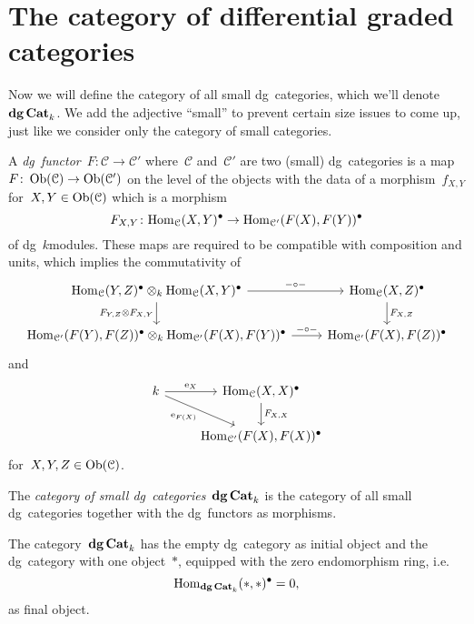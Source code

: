 \section{The category of differential graded categories}
Now we will define the category of all small dg~categories, which we'll denote~$\mathbf{dg\,Cat}_k$. We add the adjective ``small'' to prevent certain size issues to come up, just like we consider only the category of small categories.
\begin{definition}
  A \emph{dg~functor}~$F\colon\mathcal{C}\to\mathcal{C}'$ where~$\mathcal{C}$ and~$\mathcal{C}'$ are two (small) dg~categories is a map~$F\colon\operatorname{Ob}(\mathcal{C})\to\operatorname{Ob}(\mathcal{C}')$ on the level of the objects with the data of a morphism~$f_{X,Y}$ for~$X,Y\in\operatorname{Ob}(\mathcal{C})$ which is a morphism
  \begin{equation}
    F_{X,Y}\colon\mathrm{Hom}_{\mathcal{C}}(X,Y)^\bullet\to\mathrm{Hom}_{\mathcal{C}'}(F(X),F(Y))^\bullet
  \end{equation}
  of dg~$k$\dash modules. These maps are required to be compatible with composition and units, which implies the commutativity of
  \begin{equation}
    \begin{tikzcd}
      \Hom_{\mathcal{C}}(Y,Z)^\bullet\otimes_k\Hom_{\mathcal{C}}(X,Y)^\bullet \arrow{r}{-\circ-} \arrow[swap]{d}{F_{Y,Z}\otimes F_{X,Y}} & \Hom_{\mathcal{C}}(X,Z)^\bullet \arrow{d}{F_{X,Z}} \\
      \Hom_{\mathcal{C}'}(F(Y),F(Z))^\bullet\otimes_k\Hom_{\mathcal{C}'}(F(X),F(Y))^\bullet \arrow{r}{-\circ-} & \Hom_{\mathcal{C}'}(F(X),F(Z))^\bullet
    \end{tikzcd}
  \end{equation}
  and
  \begin{equation}
    \begin{tikzcd}
      k \arrow{r}{\unit_X} \arrow{rd}[swap]{\unit_{F(X)}} & \Hom_{\mathcal{C}}(X,X)^\bullet \arrow{d}{F_{X,X}} \\
      & \Hom_{\mathcal{C}'}(F(X),F(X))^\bullet
    \end{tikzcd}
  \end{equation}
  for~$X,Y,Z\in\operatorname{Ob}(\mathcal{C})$.

  The \emph{category of small dg~categories}~$\mathbf{dg\,Cat}_k$ is the category of all small dg~categories together with the dg~functors as morphisms.
\end{definition}

\begin{remark}
  \label{remark:dgCat-initial-final}
  The category~$\mathbf{dg\,Cat}_k$ has the empty dg~category as initial object and the dg~category with one object~$*$, equipped with the zero endomorphism ring, i.e.
  \begin{equation}
    \mathrm{Hom}_{\mathbf{dg\,Cat}_k}(*,*)^\bullet=0,
  \end{equation}
  as final object.
\end{remark}

